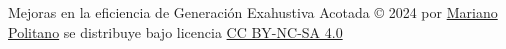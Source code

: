 \begin{titlepage}
\begin{center}
Mejoras en la eficiencia de Generaci\'on Exahustiva Acotada © 2024 por \href{https://mpolitano.github.io}{Mariano Politano} se distribuye bajo licencia \href{https://creativecommons.org/licenses/by-nc-sa/4.0/}{CC BY-NC-SA 4.0} 
\end{center}

\end{titlepage} 



